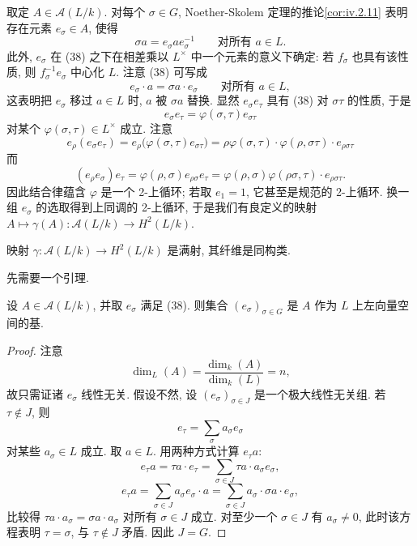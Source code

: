 取定 $A\in\mathcal{A}(L/k)$. 对每个 $\sigma\in G$, Noether-Skolem 定理的推论\ref{cor:iv.2.11} 表明存在元素 $e_{\sigma}\in A$, 使得
\begin{equation}
\sigma a=e_{\sigma}ae_{\sigma}^{-1}\qquad\text{对所有 }a\in L.\tag{38}
\end{equation}
此外, $e_\sigma$ 在 (38) 之下在相差乘以 $L^{\times}$ 中一个元素的意义下确定: 若 $f_\sigma$ 也具有该性质, 则 $f_\sigma^{-1}e_\sigma$ 中心化 $L$. 注意 (38) 可写成
\begin{equation}
e_{\sigma}\cdot a=\sigma a\cdot e_{\sigma}\qquad\text{对所有 }a\in L,\tag{39}
\end{equation}
这表明把 $e_\sigma$ 移过 $a\in L$ 时, $a$ 被 $\sigma a$ 替换. 显然 $e_\sigma e_\tau$ 具有 (38) 对 $\sigma\tau$ 的性质, 于是
\begin{equation}
e_{\sigma}e_{\tau}=\varphi(\sigma,\tau)e_{\sigma\tau}\tag{40}
\end{equation}
对某个 $\varphi(\sigma,\tau)\in L^{\times}$ 成立. 注意
\[
e_{\rho}(e_{\sigma}e_{\tau})=e_{\rho}\bigl(\varphi(\sigma,\tau)e_{\sigma\tau}\bigr)=\rho\varphi(\sigma,\tau)\cdot\varphi(\rho,\sigma\tau)\cdot e_{\rho\sigma\tau}
\]
而
\[
(e_{\rho}e_{\sigma})e_{\tau}=\varphi(\rho,\sigma)e_{\rho\sigma}e_{\tau}=\varphi(\rho,\sigma)\varphi(\rho\sigma,\tau)\cdot e_{\rho\sigma\tau}.
\]
因此结合律蕴含 $\varphi$ 是一个 2-上循环; 若取 $e_1=1$, 它甚至是规范的 2-上循环. 换一组 $e_\sigma$ 的选取得到上同调的 2-上循环, 于是我们有良定义的映射 $A\mapsto\gamma(A)\colon\mathcal{A}(L/k)\to H^2(L/k)$.

\begin{theorem}\label{thm:iv.3.11}
映射 $\gamma\colon\mathcal{A}(L/k)\to H^2(L/k)$ 是满射, 其纤维是同构类.
\end{theorem}

先需要一个引理.

\begin{lemma}\label{lem:iv.3.12}
设 $A\in\mathcal{A}(L/k)$, 并取 $e_\sigma$ 满足 (38). 则集合 $(e_\sigma)_{\sigma\in G}$ 是 $A$ 作为 $L$ 上左向量空间的基.
\end{lemma}

\begin{proof}
注意
\[
\dim_{L}(A)=\frac{\dim_{k}(A)}{\dim_{k}(L)}=n,
\]
故只需证诸 $e_\sigma$ 线性无关. 假设不然, 设 $(e_\sigma)_{\sigma\in J}$ 是一个极大线性无关组. 若 $\tau\notin J$, 则
\[
e_{\tau}=\sum_{\sigma}a_{\sigma}e_{\sigma}
\]
对某些 $a_\sigma\in L$ 成立. 取 $a\in L$. 用两种方式计算 $e_\tau a$:
\[
e_{\tau}a=\tau a\cdot e_{\tau}=\sum_{\sigma\in J}\tau a\cdot a_{\sigma}e_{\sigma},
\]
\[
e_{\tau}a=\sum_{\sigma\in J}a_{\sigma}e_{\sigma}\cdot a=\sum_{\sigma\in J}a_{\sigma}\cdot\sigma a\cdot e_{\sigma},
\]
比较得 $\tau a\cdot a_\sigma=\sigma a\cdot a_\sigma$ 对所有 $\sigma\in J$ 成立. 对至少一个 $\sigma\in J$ 有 $a_\sigma\neq 0$, 此时该方程表明 $\tau=\sigma$, 与 $\tau\notin J$ 矛盾. 因此 $J=G$.
\end{proof}


